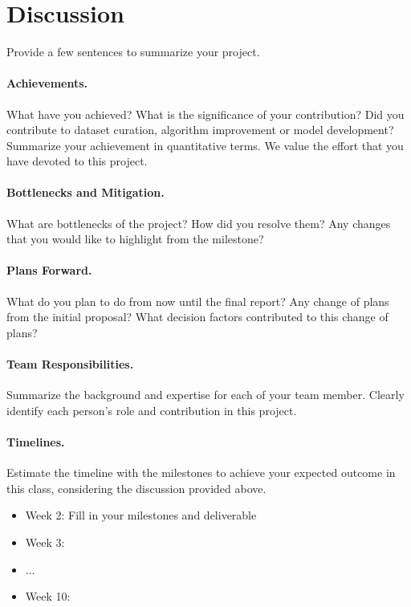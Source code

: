 \documentclass{article}
\begin{document}
\section{Discussion}
\label{sec:discussion}
Provide a few sentences to summarize your project. 

\paragraph{Achievements.}
What have you achieved? What is the significance of your contribution? Did you contribute to dataset curation, algorithm improvement or model development?  Summarize your achievement in quantitative terms. We value the effort that you have devoted to this project.




\paragraph{Bottlenecks and Mitigation.}
What are bottlenecks of the project? How did you resolve them?  Any changes that you would like to highlight from the milestone?



\paragraph{Plans Forward.}
What do you plan to do from now until the final report? Any change of plans from the initial proposal? What decision factors contributed to this change of plans?



\paragraph{Team Responsibilities.}
Summarize the background and expertise for each of your team member. Clearly identify each person's role and contribution in this project.

\paragraph{Timelines.}
Estimate the timeline with the milestones to achieve your expected outcome in this class, considering the discussion provided above.
\begin{itemize}
    \item Week 2: Fill in your milestones and deliverable
    \item Week 3:
    \item ...
    \item Week 10:
\end{itemize}
\end{document}
